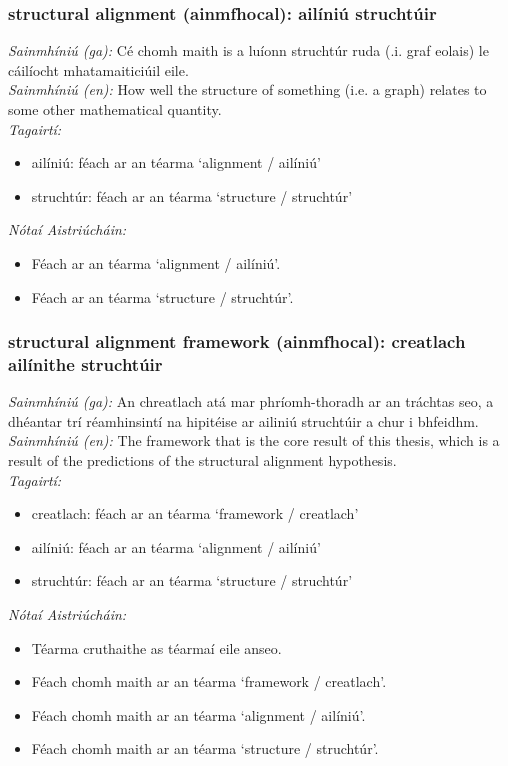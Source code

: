 \subsubsection*{structural alignment (ainmfhocal): ailíniú struchtúir}
 \noindent \textit{Sainmhíniú (ga):} Cé chomh maith is a luíonn struchtúr ruda (.i. graf eolais) le cáilíocht mhatamaiticiúil eile.
\\
 \noindent \textit{Sainmhíniú (en):} How well the structure of something (i.e. a graph) relates to some other mathematical quantity.
\\
 \noindent \textit{Tagairtí:}
\begin{itemize}
	\item ailíniú: féach ar an téarma `alignment / ailíniú'
	\item struchtúr: féach ar an téarma `structure / struchtúr'
\end{itemize}

 \noindent \textit{Nótaí Aistriúcháin:}
\begin{itemize}
	\item Féach ar an téarma `alignment / ailíniú'.
	\item Féach ar an téarma `structure / struchtúr'.
\end{itemize}


\subsubsection*{structural alignment framework (ainmfhocal): creatlach ailínithe struchtúir}
 \noindent \textit{Sainmhíniú (ga):} An chreatlach atá mar phríomh-thoradh ar an tráchtas seo, a dhéantar trí réamhinsintí na hipitéise ar ailiniú struchtúir a chur i bhfeidhm.
\\
 \noindent \textit{Sainmhíniú (en):} The framework that is the core result of this thesis, which is a result of the predictions of the structural alignment hypothesis.
\\
 \noindent \textit{Tagairtí:}
\begin{itemize}
	\item creatlach: féach ar an téarma `framework / creatlach'
	\item ailíniú: féach ar an téarma `alignment / ailíniú'
	\item struchtúr: féach ar an téarma `structure / struchtúr'
\end{itemize}

 \noindent \textit{Nótaí Aistriúcháin:}
\begin{itemize}
	\item Téarma cruthaithe as téarmaí eile anseo.
	\item Féach chomh maith ar an téarma `framework / creatlach'.
	\item Féach chomh maith ar an téarma `alignment / ailíniú'.
	\item Féach chomh maith ar an téarma `structure / struchtúr'.
\end{itemize}


